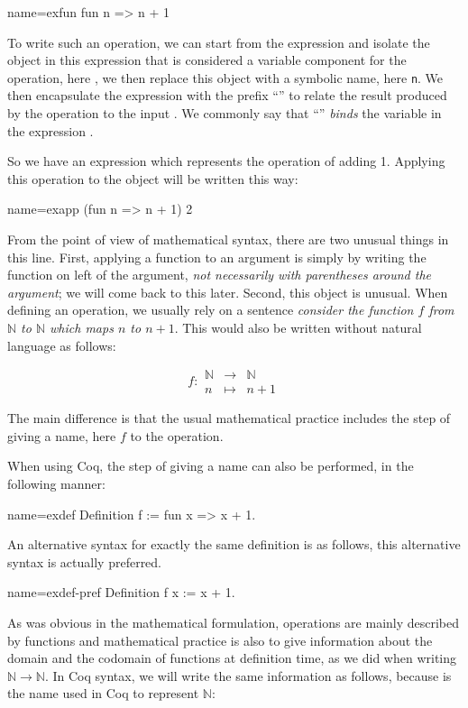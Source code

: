 \begin{coq}{name=exfun}{}
  fun n => n + 1
\end{coq}
To write such an operation, we can start from the expression 
and isolate the object in this expression that is considered a
variable component for the operation, here , we then replace
this object with a symbolic name, here {\tt n}.  We then encapsulate
the expression  with the prefix ``'' to relate
the result produced by the operation to the input .  We commonly
say that ``'' \emph{binds} the variable  in the expression
.

So we have an expression which represents the operation of adding 1.
Applying this operation to the object  will be written this
way:

\begin{coq}{name=exapp}{}
  (fun n => n + 1) 2
\end{coq}
From the point of view of mathematical syntax, there are two unusual 
things in this line.  First, applying a function to an argument is simply
by writing the function on left of the argument, {\em not necessarily
with parentheses around the argument}; we will come back to this later.
Second, this object  is unusual.  
When defining an operation, we usually
rely on a sentence {\em consider the function \(f\) from {\(\mathbb{N}\)}
to {\(\mathbb{N}\)} which maps \(n\) to \(n + 1\)}.  This would also be
written without natural language as follows:

\begin{equation}\label{equation:f}
f : 
\begin{array}{ccc}
{\mathbb{N}} &\rightarrow& {\mathbb{N}}\\
n &\mapsto& n + 1
\end{array}
\end{equation}

The main difference is that the usual mathematical practice includes
the step of giving a name, here \(f\) to the operation.

When using Coq, the step of giving a name can also be
performed, in the following manner:

\begin{coq}{name=exdef}{}
Definition f := fun x => x + 1.
\end{coq}
An alternative syntax for exactly the same definition is as follows,
this alternative syntax is actually preferred.

\begin{coq}{name=exdef-pref}{}
Definition f x := x + 1.
\end{coq}
As was obvious in the mathematical formulation, operations are mainly
described by functions and mathematical practice is also to give
information about the domain and the codomain of functions at
definition time, as we did when writing
\({\mathbb{N}}\rightarrow{\mathbb{N}}\).  In Coq syntax, we will write
the same information as follows, because  is the name used in
Coq to represent \(\mathbb{N}\):

